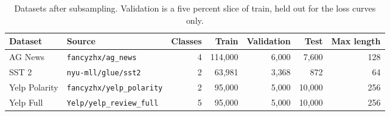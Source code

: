 \begin{table}[t]
\centering
\footnotesize
\caption{Datasets after subsampling. Validation is a five percent slice of train, held out for the loss curves only.}
\label{tab:data}
\begin{tabular}{llrrrrr}
\toprule
Dataset & Source & Classes & Train & Validation & Test & Max length \\
\midrule
AG News & \texttt{fancyzhx/ag\_news} & 4 & 114{,}000 & 6{,}000 & 7{,}600 & 128 \\
SST 2 & \texttt{nyu-mll/glue/sst2} & 2 & 63{,}981 & 3{,}368 & 872 & 64 \\
Yelp Polarity & \texttt{fancyzhx/yelp\_polarity} & 2 & 95{,}000 & 5{,}000 & 10{,}000 & 256 \\
Yelp Full & \texttt{Yelp/yelp\_review\_full} & 5 & 95{,}000 & 5{,}000 & 10{,}000 & 256 \\
\bottomrule
\end{tabular}
\end{table}

